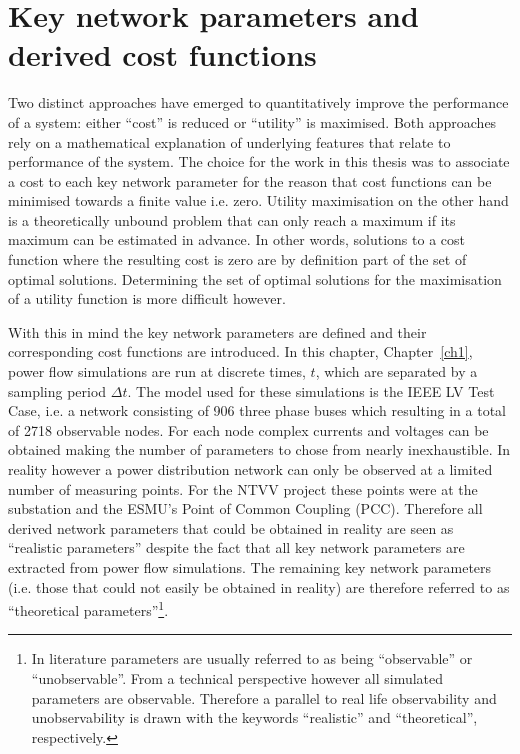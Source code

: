 \section{Key network parameters and derived cost functions}
\label{ch1:sec:key-network-parameters}

Two distinct approaches have emerged to quantitatively improve the performance of a system: either ``cost'' is reduced or ``utility'' is maximised.
Both approaches rely on a mathematical explanation of underlying features that relate to performance of the system.
The choice for the work in this thesis was to associate a cost to each key network parameter for the reason that cost functions can be minimised towards a finite value i.e. zero.
Utility maximisation on the other hand is a theoretically unbound problem that can only reach a maximum if its maximum can be estimated in advance.
In other words, solutions to a cost function where the resulting cost is zero are by definition part of the set of optimal solutions.
Determining the set of optimal solutions for the maximisation of a utility function is more difficult however.


With this in mind the key network parameters are defined and their corresponding cost functions are introduced.
In this chapter, Chapter~\ref{ch1}, power flow simulations are run at discrete times, $t$, which are separated by a sampling period $\Delta t$. 
The model used for these simulations is the IEEE LV Test Case, i.e. a network consisting of 906 three phase buses which resulting in a total of 2718 observable nodes.
For each node complex currents and voltages can be obtained making the number of parameters to chose from nearly inexhaustible.
In reality however a power distribution network can only be observed at a limited number of measuring points.
For the NTVV project these points were at the substation and the ESMU's Point of Common Coupling (PCC).
Therefore all derived network parameters that could be obtained in reality are seen as ``realistic parameters'' despite the fact that all key network parameters are extracted from power flow simulations.
The remaining key network parameters (i.e. those that could not easily be obtained in reality) are therefore referred to as ``theoretical parameters''\footnote{In literature parameters are usually referred to as being ``observable'' or ``unobservable''. From a technical perspective however all simulated parameters are observable. Therefore a parallel to real life observability and unobservability is drawn with the keywords ``realistic'' and ``theoretical'', respectively.}.


